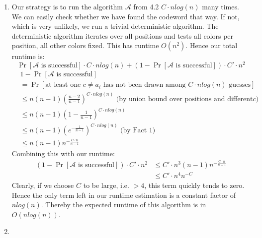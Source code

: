 \documentclass[a4paper,german]{article}
\begin{document}
\begin{enumerate}
\item
Our strategy is to run the algorithm \(\mathcal{A}\) from 4.2  \(C\cdot nlog(n) \) many times. We can easily check whether we have found the codeword that way. If not, which is very unlikely, we run a trivial deterministic algorithm. 
The deterministic algorithm iterates over all positions and tests all colors per position, all other colors fixed. This has runtime \( O (n^2) \).
Hence our total runtime is:
$$ \Pr[ \mathcal{A} \text{ is successful}] \cdot C \cdot n log(n)+ (1 - \Pr[ \mathcal{A} \text{ is successful}] ) \cdot C' \cdot n^2$$
\begin{align*}
&1 - \Pr[ \mathcal{A} \text{ is successful}] \\
&= \Pr[\text{at least one } c \neq a_i \text{ has not been drawn among } C \cdot nlog(n) \text{ guesses}] \\
&\leq n(n-1)(\frac{n-2}{n-1})^{C \cdot nlog(n)} \text{ (by union bound over positions and different} c \text{)} \\
&\leq n(n-1)(1 - \frac{1}{n-1})^{C \cdot nlog(n)} \\
&\leq n(n-1)(e^{- \frac{1}{n-1}})^{C \cdot nlog(n)} \text{ (by Fact 1)} \\
&\leq n(n-1)n^{-\frac{C\cdot n}{n-1}} 
\end{align*}
Combining this with our runtime:
\begin{align*}
(1 - \Pr[ \mathcal{A} \text{ is successful}] ) \cdot C' \cdot n^2 &\leq C' \cdot n^3 (n-1) n^{-\frac{C\cdot n}{n-1}} \\
&\leq C' \cdot n^4 n^{-C}
\end{align*}
Clearly, if we choose \(C\) to be large, i.e. \(> 4\), this term quickly tends to zero. Hence the only term left in our runtime estimation is a constant factor of \(n log(n)\). Thereby the expected runtime of this algorithm is in \(O(nlog(n))\). 
\item

\end{enumerate}
\end{document}
